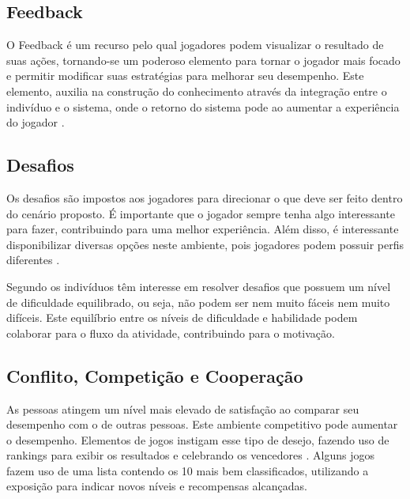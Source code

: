 \documentclass[
	12pt,				%
	oneside,			%
	a4paper,			%
	english,			%
	french,				%
	spanish,			%
	brazil,				%
	]{abntex2}
\begin{document}
\subsection{Feedback}            

O Feedback é um recurso pelo qual jogadores podem visualizar o resultado de suas ações, tornando-se um poderoso elemento para tornar o jogador mais focado e permitir modificar suas estratégias para melhorar seu desempenho. Este elemento, auxilia na construção do conhecimento através da integração entre o indivíduo e o sistema, onde o retorno do sistema pode ao aumentar a experiência do jogador \cite{fardo2013gamificaccao}.
    
\subsection{Desafios}                

Os desafios são impostos aos jogadores para direcionar o que deve ser feito dentro do cenário proposto. É importante que o jogador sempre tenha algo interessante para fazer, contribuindo para uma melhor experiência. Além disso, é interessante disponibilizar diversas opções neste ambiente, pois jogadores podem possuir perfis diferentes \cite{fardo2013gamificaccao}.

Segundo \citet{busarello2016gamificaccao} os indivíduos têm interesse em resolver desafios que possuem um nível de dificuldade equilibrado, ou seja, não podem ser nem muito fáceis nem muito difíceis. Este equilíbrio entre os níveis de dificuldade e habilidade podem colaborar para o fluxo da atividade, contribuindo para o motivação.
    
\subsection{Conflito, Competição e Cooperação}                    

As pessoas atingem um nível mais elevado de satisfação ao comparar seu desempenho com o de outras pessoas. Este ambiente competitivo pode aumentar o desempenho. Elementos de jogos instigam esse tipo de desejo, fazendo uso de rankings para exibir os resultados e celebrando os vencedores  \cite{bunchball2016gamification}. Alguns jogos fazem uso de uma lista contendo os 10 mais bem classificados, utilizando a exposição para indicar novos níveis e recompensas alcançadas.

\end{document}
